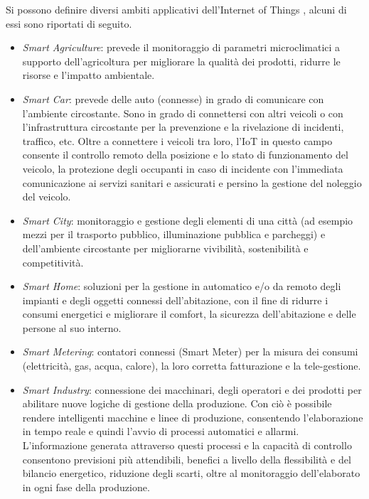 \noindent Si possono definire diversi ambiti applicativi dell'Internet of Things \cite{marjani2017big}, alcuni di essi sono riportati di seguito.
\begin{itemize}
    \item \textit{Smart Agriculture}: prevede il monitoraggio di parametri microclimatici a supporto dell'agricoltura per migliorare la qualità dei prodotti, ridurre le risorse e l'impatto ambientale.
    
    \item \textit{Smart Car}: prevede delle auto (connesse) in grado di comunicare con l'ambiente circostante. Sono in grado di connettersi con altri veicoli o con l'infrastruttura circostante per la prevenzione e la rivelazione di incidenti, traffico, etc. Oltre a connettere i veicoli tra loro, l'IoT in questo campo consente il controllo remoto della posizione e lo stato di funzionamento del veicolo, la protezione degli occupanti in caso di incidente con l'immediata comunicazione ai servizi sanitari e assicurati e persino la gestione del noleggio del veicolo.
    
    \item \textit{Smart City}: monitoraggio e gestione degli elementi di una città (ad esempio mezzi per il trasporto pubblico, illuminazione pubblica e parcheggi) e dell’ambiente circostante per migliorarne vivibilità, sostenibilità e competitività.
    
    \item \textit{Smart Home}: soluzioni per la gestione in automatico e/o da remoto degli impianti e degli oggetti connessi dell’abitazione, con il fine di ridurre i consumi energetici e migliorare il comfort, la sicurezza dell’abitazione e delle persone al suo interno.
    
    \item \textit{Smart Metering}: contatori connessi (Smart Meter) per la misura dei consumi (elettricità, gas, acqua, calore), la loro corretta fatturazione e la tele-gestione.
    
    \item \textit{Smart Industry}: connessione dei macchinari, degli operatori e dei prodotti per abilitare nuove logiche di gestione della produzione. Con ciò è possibile rendere intelligenti macchine e linee di produzione, consentendo l'elaborazione in tempo reale e quindi l'avvio di processi automatici e allarmi. L'informazione generata attraverso questi processi e la capacità di controllo consentono previsioni più attendibili, benefici a livello della flessibilità e del bilancio energetico, riduzione degli scarti, oltre al monitoraggio dell'elaborato in ogni fase della produzione.
\end{itemize}

